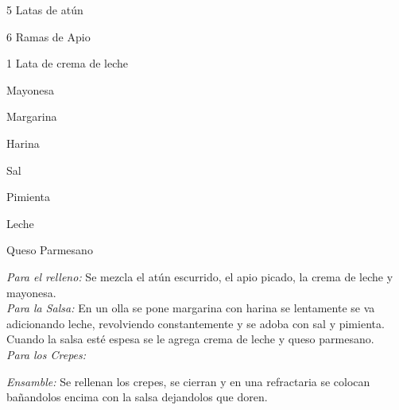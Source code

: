


\begin{ingredientes}
\item 5 Latas de atún
\item 6 Ramas de Apio
\item 1 Lata de crema de leche
\item Mayonesa
\item Margarina
\item Harina
\item Sal
\item Pimienta
\item Leche
\item Queso Parmesano
\end{ingredientes}
\preparacion
\emph{Para el relleno:} Se mezcla el atún escurrido, el apio picado, la crema de leche y mayonesa.\\

\emph{Para la Salsa:} En un olla se pone margarina con harina se lentamente se va adicionando leche, revolviendo constantemente y se adoba con sal y pimienta. Cuando la salsa esté espesa se le agrega crema de leche y queso parmesano.\\

\emph{Para los Crepes:}

\emph{Ensamble:} Se rellenan los crepes, se cierran y en una refractaria se colocan bañandolos encima con la salsa dejandolos que doren.
